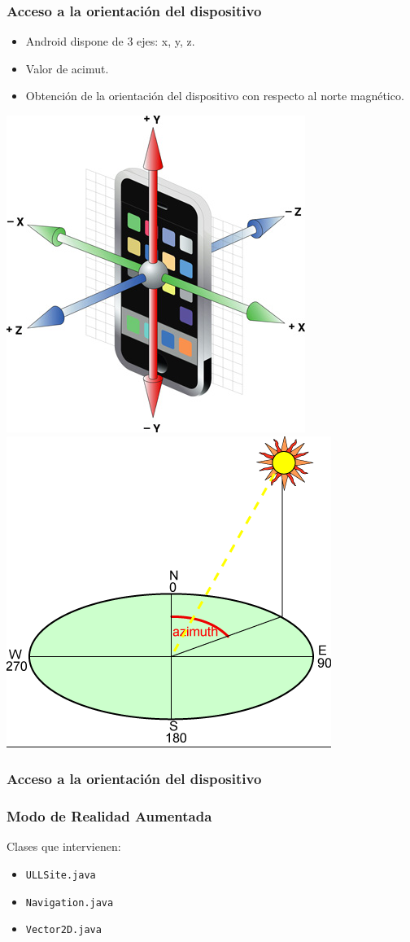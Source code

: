 \begin{frame}
	\frametitle{Acceso a la orientación del dispositivo}
			\begin{itemize}
				\item Android dispone de 3 ejes: x, y, z.
				\item Valor de acimut.
				\item Obtención de la orientación del dispositivo con respecto al norte magnético.
			\end{itemize}
		\endblock{}

		\begin{center} 
			\hspace*{0.5in}
			\includegraphics[width=0.3\linewidth]{Images/xyz}
			\hfill
			\includegraphics[width=0.3\linewidth]{Images/acimut}
			\hspace*{0.5in}
		\end{center}
\end{frame}		
		

\begin{frame}
	\frametitle{Acceso a la orientación del dispositivo}
	
\end{frame}


\begin{frame}
	\frametitle{Modo de Realidad Aumentada}
			Clases que intervienen:
			\begin{itemize}
				\item \texttt{ULLSite.java}
				\item \texttt{Navigation.java}
				\item \texttt{Vector2D.java}
			\end{itemize}
			\endblock{}


\end{frame}


